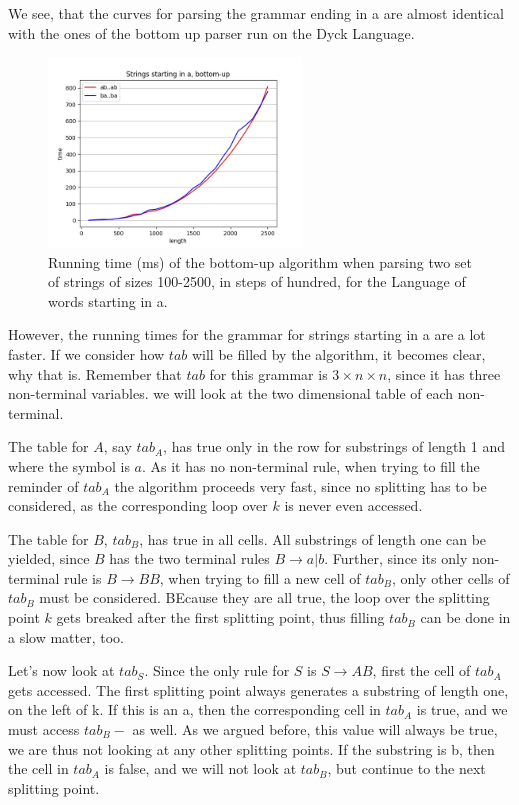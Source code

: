 We see, that the curves for parsing the grammar ending in a are almost identical with the ones of the bottom up parser run on the Dyck Language.

\begin{figure}[h!]
    \centering
    \includegraphics[width=0.6\textwidth]{Images/t_sa_bu.jpg}
    \caption{Running time (ms) of the bottom-up algorithm when parsing two set of strings of sizes 100-2500, in steps of hundred, for the Language of words starting in a.}
    \label{fig:t_sa_bu}
\end{figure}

However, the running times for the grammar for strings starting in a are a lot faster.
If we consider how $tab$ will be filled by the algorithm, it becomes clear, why that is.
Remember that $tab$ for this grammar is $3\times n\times n$, since it has three non-terminal variables.
we will look at the two dimensional table of each non-terminal.

The table for $A$, say $tab_A$, has true only in the row for substrings of length 1 and where the symbol is $a$.
As it has no non-terminal rule, when trying to fill the reminder of $tab_A$ the algorithm proceeds very fast, since no splitting has to be considered, as the corresponding loop over $k$ is never even accessed.

The table for $B$, $tab_B$, has true in all cells.
All substrings of length one can be yielded, since $B$ has the two terminal rules $B\rightarrow a|b$.
Further, since its only non-terminal rule is $B\rightarrow BB$, when trying to fill a new cell of $tab_B$, only other cells of $tab_B$ must be considered.
BEcause they are all true, the loop over the splitting point $k$ gets breaked after the first splitting point, thus filling $tab_B$ can be done in a slow matter, too.

Let's now look at $tab_S$.
Since the only rule for $S$ is $S\rightarrow AB$, first the cell of $tab_A$ gets accessed.
The first splitting point always generates a substring of length one, on the left of k.
If this is an a, then the corresponding cell in $tab_A$ is true, and we must access $tab_B-$ as well.
As we argued before, this value will always be true, we are thus not looking at any other splitting points.
If the substring is b, then the cell in $tab_A$ is false, and we will not look at $tab_B$, but continue to the next splitting point.

